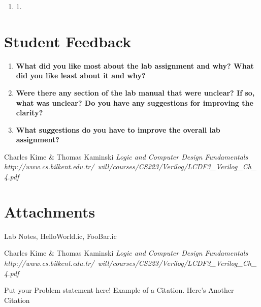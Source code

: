 \documentclass[a4paper,12pt]{article}
\begin{document}
\begin{enumerate}
  \item 1.
\end{enumerate}

\section*{Student Feedback}

\begin{enumerate}
  \item \textbf{What did you like most about the lab assignment and why? What did you like least about it and why?}
  \vspace{10pt}

  \item \textbf{Were there any section of the lab manual that were unclear? If so, what was unclear? Do you have any suggestions for improving the clarity?}
  \vspace{10pt}

  \item \textbf{What suggestions do you have to improve the overall lab assignment?}
  \vspace{10pt}

\end{enumerate}


\begin{thebibliography}{1}
 Charles Kime \& Thomas Kaminski  \emph{Logic and Computer Design Fundamentals} \\ \hspace{15pt}\textit{http://www.cs.bilkent.edu.tr/~will/courses/CS223/Verilog/LCDF3_Verilog_Ch_4.pdf}
\end{thebibliography}

\section*{Attachments}
Lab Notes, HelloWorld.ic, FooBar.ic

\begin{thebibliography}{9}
 Charles Kime & Thomas Kaminski  \emph{Logic and Computer Design Fundamentals} \textit{http://www.cs.bilkent.edu.tr/~will/courses/CS223/Verilog/LCDF3_Verilog_Ch_4.pdf}
\end{thebibliography}

Put your Problem statement here! Example of a Citation\cite[p.219]{Robotics}. Here's Another Citation\cite{Flueck}
\fi
\end{document}
